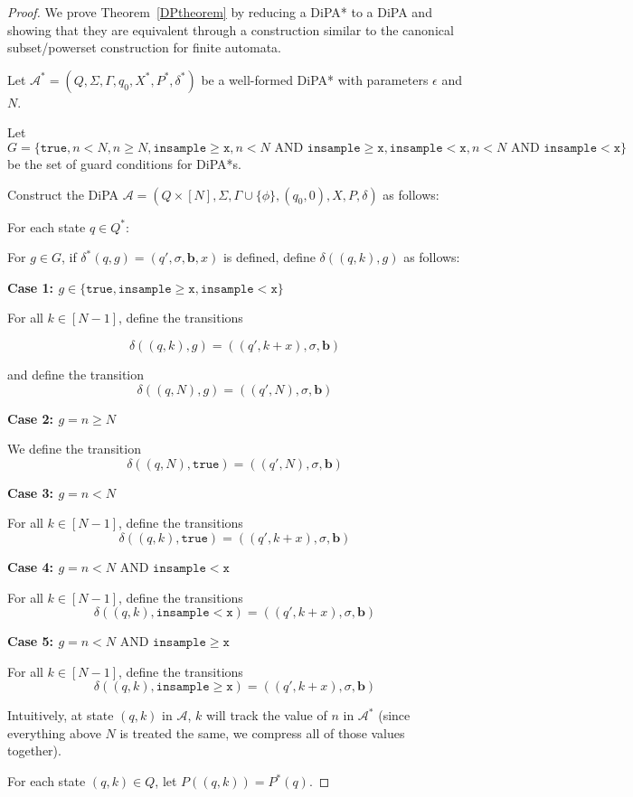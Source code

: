 \documentclass[12pt]{article}
\newcommand{\gguard}{\texttt{insample}\geq \texttt{x}}
\newcommand{\lguard}{\texttt{insample} < \texttt{x}}
\newcommand{\gaguard}{n<N \text{ AND } \texttt{insample} \geq \texttt{x}}
\newcommand{\laguard}{n<N\text{ AND }\texttt{insample} < \texttt{x}}
\theoremstyle{definition}
\begin{document}
\begin{proof}

We prove Theorem~\ref{DPtheorem} by reducing a DiPA* to a DiPA and showing that they are equivalent through a construction similar to the canonical subset/powerset construction for finite automata.

Let $\mathcal{A}^* = (Q, \Sigma, \Gamma, q_0, X^*, P^*, \delta^*)$ be a well-formed DiPA* with parameters $\epsilon$ and $N$. 

Let $G = \{\texttt{true}, n<N, n\geq N, \gguard, \gaguard, \lguard,\laguard \}$ be the set of guard conditions for DiPA*s.

Construct the DiPA $\mathcal{A} = (Q \times [N], \Sigma, \Gamma\cup \{\phi\}, (q_0, 0), X, P, \delta)$ as follows:

For each state $q \in Q^*$:

For $g\in G$, if $\delta^*(q, g) = (q', \sigma, \mathbf{b}, x)$ is defined, define $\delta((q, k), g)$ as follows:

\textbf{Case 1: $g \in \{\texttt{true}, \gguard, \lguard\}$}

For all $k \in [N-1]$, define the transitions

\[
	\delta((q, k), g) = ((q', k+x), \sigma, \mathbf{b})	
\]

and define the transition
\[
	\delta((q, N), g) = ((q', N), \sigma, \mathbf{b})	
\]

\textbf{Case 2: $g = n \geq N$}

We define the transition 
\[
	\delta((q, N), \texttt{true}) = ((q', N), \sigma, \mathbf{b})
\]

\textbf{Case 3: $g = n < N$}

For all $k \in [N-1]$, define the transitions
\[
	\delta((q, k), \texttt{true}) = ((q', k+x), \sigma, \mathbf{b})	
\]

\textbf{Case 4: $g = \laguard $}

For all $k \in [N-1]$, define the transitions
\[
	\delta((q, k), \lguard) = ((q', k+x), \sigma, \mathbf{b})	
\]

\textbf{Case 5: $g = \gaguard $}

For all $k \in [N-1]$, define the transitions
\[
	\delta((q, k), \gguard) = ((q', k+x), \sigma, \mathbf{b})	
\]

Intuitively, at state $(q, k)$ in $\mathcal{A}$, $k$ will track the value of $n$ in $\mathcal{A}^*$ (since everything above $N$ is treated the same, we compress all of those values together).

For each state $(q, k)\in Q$, let $P((q, k)) = P^*(q)$.


\end{proof}
\end{document}
